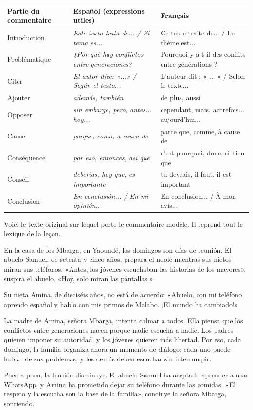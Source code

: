 \documentclass[11pt]{article}
\newcounter{popsec}
\newcounter{popsub}
\newcommand{\courssub}[1]{%
  \stepcounter{popsub}%
  \par\vspace{9pt}\noindent{\popxbold\fontsize{11.5}{13}\selectfont\color{popink}{\color{poporange}\thepopsec.\thepopsub}\hspace{6pt}#1}\par\nopagebreak\vspace{4pt}
}
\newcommand{\esp}[1]{\ifmmode\text{\textit{#1}}\else\begingroup\selectlanguage{spanish}\itshape #1\endgroup\fi}
\begin{document}
\begin{center}
\begin{tabularx}{\linewidth}{|X|X|X|}
\hline
\rowcolor{popblueL} Partie du commentaire & Español (expressions utiles) & Français \\
\hline
Introduction & \esp{Este texto trata de... / El tema es...} & Ce texte traite de... / Le thème est... \\
\hline
Problématique & \esp{¿Por qué hay conflictos entre generaciones?} & Pourquoi y a-t-il des conflits entre générations ? \\
\hline
Citer & \esp{El autor dice: «...» / Según el texto...} & L'auteur dit : « ... » / Selon le texte... \\
\hline
Ajouter & \esp{además, también} & de plus, aussi \\
\hline
Opposer & \esp{sin embargo, pero, antes... hoy...} & cependant, mais, autrefois... aujourd'hui... \\
\hline
Cause & \esp{porque, como, a causa de} & parce que, comme, à cause de \\
\hline
Conséquence & \esp{por eso, entonces, así que} & c'est pourquoi, donc, si bien que \\
\hline
Conseil & \esp{deberías, hay que, es importante} & tu devrais, il faut, il est important \\
\hline
Conclusion & \esp{En conclusión... / En mi opinión...} & En conclusion... / À mon avis... \\
\hline
\end{tabularx}
\end{center}

\courssub{Texte support : Un domingo en familia}

Voici le texte original sur lequel porte le commentaire modèle. Il reprend tout le lexique de la leçon.

\begin{textebox}
En la casa de los Mbarga, en Yaoundé, los domingos son días de reunión. El abuelo Samuel, de setenta y cinco años, prepara el ndolé mientras sus nietos miran sus teléfonos. «Antes, los jóvenes escuchaban las historias de los mayores», suspira el abuelo. «Hoy, solo miran las pantallas.»

Su nieta Amina, de dieciséis años, no está de acuerdo: «Abuelo, con mi teléfono aprendo español y hablo con mis primos de Malabo. ¡El mundo ha cambiado!»

La madre de Amina, señora Mbarga, intenta calmar a todos. Ella piensa que los conflictos entre generaciones nacen porque nadie escucha a nadie. Los padres quieren imponer su autoridad, y los jóvenes quieren más libertad. Por eso, cada domingo, la familia organiza ahora un momento de diálogo: cada uno puede hablar de sus problemas, y los demás deben escuchar sin interrumpir.

Poco a poco, la tensión disminuye. El abuelo Samuel ha aceptado aprender a usar WhatsApp, y Amina ha prometido dejar su teléfono durante las comidas. «El respeto y la escucha son la base de la familia», concluye la señora Mbarga, sonriendo.
\end{textebox}
\end{document}
